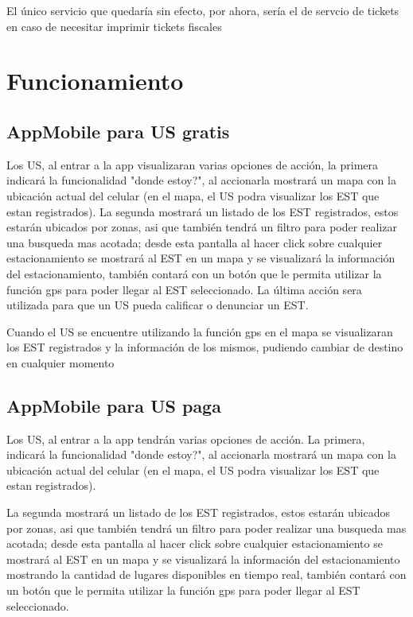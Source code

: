 \documentclass[spanish, DIV=calc, paper=a4, fontsize=11pt, twocolumn]{scrartcl}	 %
\begin{document}
El único servicio que quedaría sin efecto, por ahora, sería el de servcio de tickets en caso de necesitar imprimir tickets fiscales

\section{Funcionamiento}

\subsection{AppMobile para US gratis}
Los US, al entrar a la app visualizaran varias opciones de acción, la primera indicará la funcionalidad "donde estoy?", al accionarla mostrará un mapa con la ubicación actual del celular (en el mapa, el US podra visualizar los EST que estan registrados). La segunda mostrará un listado de los EST registrados, estos estarán ubicados por zonas, asi que  también tendrá un filtro para poder realizar una busqueda mas acotada; desde esta pantalla al hacer click sobre cualquier estacionamiento se mostrará al EST en un mapa y se visualizará la información del estacionamiento, también contará con un botón que le permita utilizar la función gps para poder llegar al EST seleccionado. La última acción sera utilizada para que un US pueda calificar o denunciar un EST.
				
Cuando el US se encuentre utilizando la función gps en el mapa se visualizaran los EST registrados y la información de los mismos, pudiendo	cambiar de destino en cualquier momento

\subsection{AppMobile para US paga}
Los US, al entrar a la app tendrán varias opciones de acción. La primera, indicará la funcionalidad "donde estoy?", al accionarla mostrará un mapa con la ubicación actual del celular (en el mapa, el US podra visualizar los EST que estan registrados). 

La segunda mostrará un listado de los EST registrados, estos estarán ubicados por zonas, asi que también tendrá un filtro para poder realizar una busqueda mas acotada; desde esta pantalla al hacer click sobre cualquier estacionamiento se mostrará al EST en un mapa y se visualizará la información del estacionamiento mostrando la cantidad de lugares disponibles en tiempo real, también contará con un botón que le permita utilizar la función	gps para poder llegar al EST seleccionado.
\end{document}
